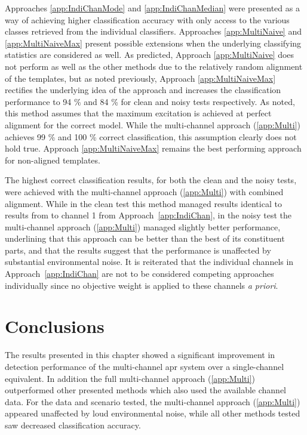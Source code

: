 Approaches \ref{app:IndiChanMode} and \ref{app:IndiChanMedian} were presented as a way of achieving higher classification accuracy with only access to the various classes retrieved from the individual classifiers. Approaches \ref{app:MultiNaive} and \ref{app:MultiNaiveMax} present possible extensions when the underlying classifying statistics are considered as well. As predicted, Approach \ref{app:MultiNaive} does not perform as well as the other methods due to the relatively random alignment of the templates, but as noted previously, Approach \ref{app:MultiNaiveMax} rectifies the underlying idea of the approach and increases the classification performance to 94 \% and 84 \% for clean and noisy tests respectively. As noted, this method assumes that the maximum excitation is achieved at perfect alignment for the correct model. While the multi-channel approach (\ref{app:Multi}) achieves 99 \% and 100 \% correct classification, this assumption clearly does not hold true. Approach \ref{app:MultiNaiveMax} remains the best performing approach for non-aligned templates.

The highest correct classification results, for both the clean and the noisy tests, were achieved with the multi-channel approach (\ref{app:Multi}) with combined alignment. While in the clean test this method managed results identical to results from to channel 1 from Approach~\ref{app:IndiChan}, in the noisy test the multi-channel approach (\ref{app:Multi}) managed slightly better performance, underlining that this approach can be better than the best of its constituent parts, and that the results suggest that the performance is unaffected by substantial environmental noise. It is reiterated that the individual channels in Approach~\ref{app:IndiChan} are not to be considered competing approaches individually since no objective weight is applied to these channels \emph{a priori}.



\section{Conclusions}
The results presented in this chapter showed a significant improvement in detection performance of the multi-channel \gls{apr} system over a single-channel equivalent. In addition the full multi-channel approach (\ref{app:Multi}) outperformed other presented methods which also used the available channel data. For the data and scenario tested, the multi-channel approach (\ref{app:Multi}) appeared unaffected by loud environmental noise, while all other methods tested saw decreased classification accuracy.

